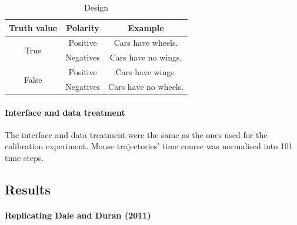 \documentclass{article}
\begin{document}
\begin{table}[h]
\centering
\begin{tabular}{ccc}
Truth value & Polarity & Example \\
\hline
\multirow{2}{*}{True} & Positive & Cars have wheels.\\ 
 & Negatives & Cars have no wings.\\ 
\hline
\multirow{2}{*}{False} & Positive & Cars have wings.\\ 
 & Negatives & Cars have no wheels.\\
\end{tabular}
\caption{Design} \label{table:exampleDD}
\end{table}


\paragraph{Interface and data treatment}
The interface and data treatment were the same as the ones used for the calibration experiment. Mouse trajectories' time course was normalised into 101 time steps.

\subsection{Results}
\paragraph{Replicating Dale and Duran (2011)}
\end{document}
